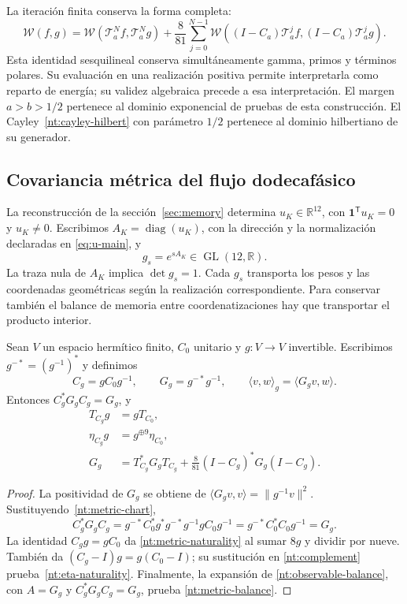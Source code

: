 La iteración finita conserva la forma completa:
\[
 \mathscr W(f,g)
 =\mathscr W(\mathcal T_a^Nf,\mathcal T_a^Ng)
 +\frac8{81}\sum_{j=0}^{N-1}
 \mathscr W((I-C_a)\mathcal T_a^jf,
            (I-C_a)\mathcal T_a^jg).
\]
Esta identidad sesquilineal conserva simultáneamente
gamma, primos y términos polares. Su evaluación en una
realización positiva permite interpretarla como reparto
de energía; su validez algebraica precede a esa
interpretación. El margen \(a>b>1/2\) pertenece al
dominio exponencial de pruebas de esta construcción.
El Cayley~\eqref{nt:cayley-hilbert} con parámetro \(1/2\)
pertenece al dominio hilbertiano de su generador.

\subsection{Covariancia métrica del flujo dodecafásico}

La reconstrucción de la sección~\ref{sec:memory} determina
\(u_K\in\mathbb R^{12}\), con
\(\mathbf1^{\mathsf T}u_K=0\) y \(u_K\ne0\).
Escribimos \(A_K=\operatorname{diag}(u_K)\), con la dirección y la
normalización declaradas en \eqref{eq:u-main}, y
\[
 g_s=e^{sA_K}\in\operatorname{GL}(12,\mathbb R).
\]
La traza nula de \(A_K\) implica \(\det g_s=1\).
Cada \(g_s\) transporta los pesos y las coordenadas
geométricas según la realización correspondiente.
Para conservar también el balance de memoria entre
coordenatizaciones hay que transportar el producto interior.

\begin{proposition}
Sean \(V\) un espacio hermítico finito, \(C_0\) unitario
y \(g:V\to V\) invertible. Escribimos
\(g^{-*}=(g^{-1})^*\) y definimos
\begin{equation}
 C_g=gC_0g^{-1},\qquad
 G_g=g^{-*}g^{-1},\qquad
 \langle v,w\rangle_g=\langle G_gv,w\rangle.
 \label{nt:metric-chart}
\end{equation}
Entonces \(C_g^*G_gC_g=G_g\), y
\begin{align}
 T_{C_g}g&=gT_{C_0},\label{nt:metric-naturality}\\
 \eta_{C_g}g&=g^{\oplus9}\eta_{C_0},\label{nt:eta-naturality}\\
 G_g&=T_{C_g}^*G_gT_{C_g}
 +\frac8{81}(I-C_g)^*G_g(I-C_g).\label{nt:metric-balance}
\end{align}
\end{proposition}

\begin{proof}
La positividad de \(G_g\) se obtiene de
\(\langle G_gv,v\rangle=\|g^{-1}v\|^2\).
Sustituyendo~\eqref{nt:metric-chart},
\[
 C_g^*G_gC_g
 =g^{-*}C_0^*g^*g^{-*}g^{-1}gC_0g^{-1}
 =g^{-*}C_0^*C_0g^{-1}=G_g.
\]
La identidad \(C_gg=gC_0\) da
\eqref{nt:metric-naturality} al sumar \(8g\) y dividir
por nueve. También da
\((C_g-I)g=g(C_0-I)\); su sustitución en
\eqref{nt:complement} prueba~\eqref{nt:eta-naturality}.
Finalmente, la expansión de
\eqref{nt:observable-balance}, con \(A=G_g\) y
\(C_g^*G_gC_g=G_g\), prueba
\eqref{nt:metric-balance}.
\end{proof}

